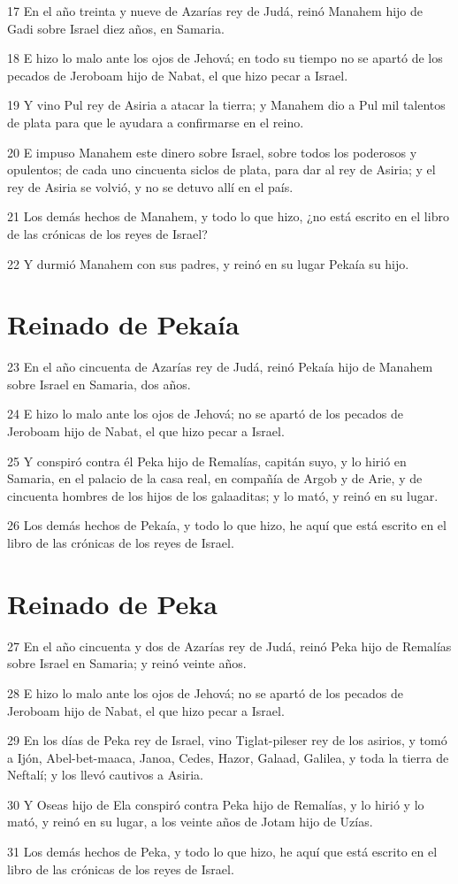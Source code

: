 \par 17 En el año treinta y nueve de Azarías rey de Judá, reinó Manahem hijo de Gadi sobre Israel diez años, en Samaria.
\par 18 E hizo lo malo ante los ojos de Jehová; en todo su tiempo no se apartó de los pecados de Jeroboam hijo de Nabat, el que hizo pecar a Israel.
\par 19 Y vino Pul rey de Asiria a atacar la tierra; y Manahem dio a Pul mil talentos de plata   para que le ayudara a confirmarse en el reino.
\par 20 E impuso Manahem este dinero sobre Israel, sobre todos los poderosos y opulentos; de cada uno cincuenta siclos de plata,   para dar al rey de Asiria; y el rey de Asiria se volvió, y no se detuvo allí en el país.
\par 21 Los demás hechos de Manahem, y todo lo que hizo, ¿no está escrito en el libro de las crónicas de los reyes de Israel?
\par 22 Y durmió Manahem con sus padres, y reinó en su lugar Pekaía su hijo.

\section*{Reinado de Pekaía}

\par 23 En el año cincuenta de Azarías rey de Judá, reinó Pekaía hijo de Manahem sobre Israel en Samaria, dos años.
\par 24 E hizo lo malo ante los ojos de Jehová; no se apartó de los pecados de Jeroboam hijo de Nabat, el que hizo pecar a Israel.
\par 25 Y conspiró contra él Peka hijo de Remalías, capitán suyo, y lo hirió en Samaria, en el palacio de la casa real, en compañía de Argob y de Arie, y de cincuenta hombres de los hijos de los galaaditas; y lo mató, y reinó en su lugar.
\par 26 Los demás hechos de Pekaía, y todo lo que hizo, he aquí que está escrito en el libro de las crónicas de los reyes de Israel.

\section*{Reinado de Peka}

\par 27 En el año cincuenta y dos de Azarías rey de Judá, reinó Peka hijo de Remalías sobre Israel en Samaria; y reinó veinte años.
\par 28 E hizo lo malo ante los ojos de Jehová; no se apartó de los pecados de Jeroboam hijo de Nabat, el que hizo pecar a Israel.
\par 29 En los días de Peka rey de Israel, vino Tiglat-pileser rey de los asirios, y tomó a Ijón, Abel-bet-maaca, Janoa, Cedes, Hazor, Galaad, Galilea, y toda la tierra de Neftalí; y los llevó cautivos a Asiria.
\par 30 Y Oseas hijo de Ela conspiró contra Peka hijo de Remalías, y lo hirió y lo mató, y reinó en su lugar, a los veinte años de Jotam hijo de Uzías.
\par 31 Los demás hechos de Peka, y todo lo que hizo, he aquí que está escrito en el libro de las crónicas de los reyes de Israel.


